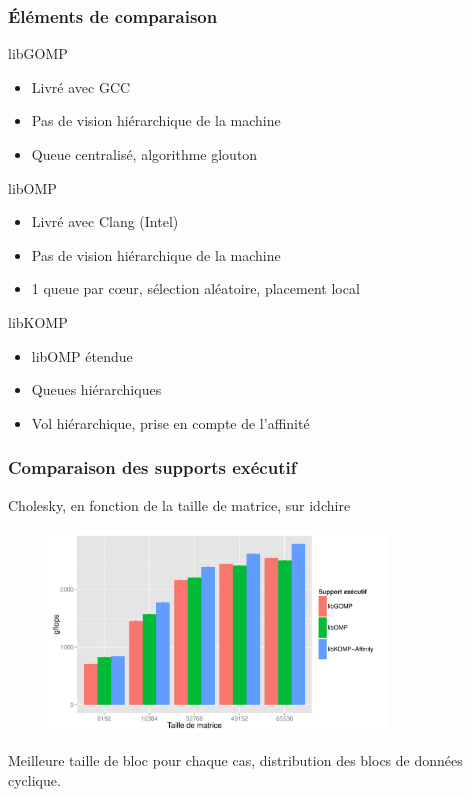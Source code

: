 \documentclass[xcolor={usenames,dvipsnames,svgnames,table}, aspectratio=43]{beamer}
\begin{document}
\begin{frame}
  \frametitle{Éléments de comparaison}

  \begin{block}{libGOMP}
    \begin{itemize}
      \item Livré avec GCC
      \item Pas de vision hiérarchique de la machine
      \item Queue centralisé, algorithme glouton
    \end{itemize}
  \end{block}

  \begin{block}{libOMP}
    \begin{itemize}
      \item Livré avec Clang (Intel)
      \item Pas de vision hiérarchique de la machine
      \item 1 queue par cœur, sélection aléatoire, placement local
    \end{itemize}
  \end{block}

  \begin{block}{libKOMP}
    \begin{itemize}
      \item libOMP étendue
      \item Queues hiérarchiques
      \item Vol hiérarchique, prise en compte de l'affinité
    \end{itemize}
  \end{block}

\end{frame}




\begin{frame}
  \frametitle{Comparaison des supports exécutif}
  Cholesky, en fonction de la taille de matrice, sur idchire
  \begin{figure}
    \includegraphics[width=0.8\textwidth]{graph/graph_details_cholesky_idchire.pdf}
  \end{figure}
  Meilleure taille de bloc pour chaque cas, distribution des blocs de données cyclique.
\end{frame}
\end{document}
